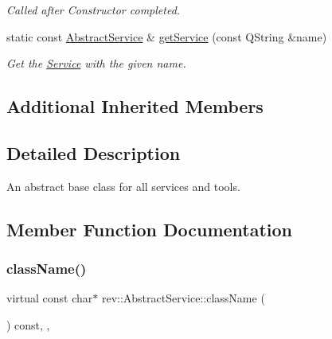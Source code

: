 \begin{DoxyCompactItemize}
\begin{DoxyCompactList}\small\item\em Called after Constructor completed. \end{DoxyCompactList}\item 
\mbox{\label{classrev_1_1_abstract_service_a9b3a0ed8e78827c7a0f74302a49e3dfa}} 
static const \mbox{\hyperlink{classrev_1_1_abstract_service}{Abstract\+Service}} \& \mbox{\hyperlink{classrev_1_1_abstract_service_a9b3a0ed8e78827c7a0f74302a49e3dfa}{get\+Service}} (const Q\+String \&name)
\begin{DoxyCompactList}\small\item\em Get the \mbox{\hyperlink{classrev_1_1_service}{Service}} with the given name. \end{DoxyCompactList}\end{DoxyCompactItemize}
\subsection*{Additional Inherited Members}


\subsection{Detailed Description}
An abstract base class for all services and tools. 

\subsection{Member Function Documentation}
\mbox{\label{classrev_1_1_abstract_service_a0b64ee4651db7637a70265697ca62453}} 
\subsubsection{\texorpdfstring{className()}{className()}}
{\footnotesize\ttfamily virtual const char$\ast$ rev\+::\+Abstract\+Service\+::class\+Name (\begin{DoxyParamCaption}{ }\end{DoxyParamCaption}) const\hspace{0.3cm}{\ttfamily [inline]}, {\ttfamily [override]}, {\ttfamily [virtual]}}



